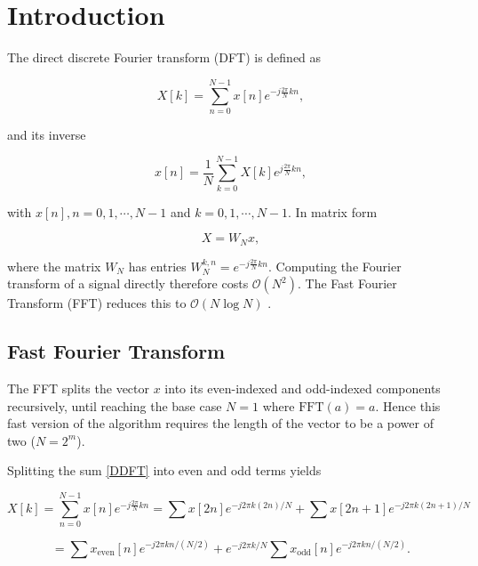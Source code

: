 \documentclass[11pt,a4paper,twoside,pdf]{article}
\numberwithin{equation}{section}
\begin{document}

\tableofcontents


\pagestyle{fancy}
\fancyhead[RO,LE]{\leftmark}
\fancyhead[LO,RE]{\thepage}
\fancyfoot{}



\newpage


\section{Introduction}
\label{intro}


The direct discrete Fourier transform (DFT) is defined as \cite{angulo2012variable}

\begin{equation}
    X[k] = \sum_{n=0}^{N-1} x[n] e^{-j\frac{2\pi}{N}kn},
\tag{1}
\label{DDFT}
\end{equation}

and its inverse

$$
    x[n] = \frac1N\sum_{k=0}^{N-1} X[k] e^{j\frac{2\pi}{N}kn},
$$


with $x[n], n = 0, 1, \cdots, N-1$ and $k = 0, 1, \cdots, N-1$. In matrix form

$$
    X = W_N x,
$$

where the matrix $W_N$ has entries $W^{k,n}_N = e^{-j\frac{2\pi}{N}kn}$. Computing the Fourier transform of a signal directly therefore costs $\mathcal{O}(N^2)$. The Fast Fourier Transform (FFT) reduces this to $\mathcal{O}(N\log N)$ \cite{brigham1988fast}.

\subsection{Fast Fourier Transform}


The FFT splits the vector $x$ into its even-indexed and odd-indexed components recursively, until reaching the base case $N=1$ where $\mathrm{FFT}(a) = a$. Hence this fast version of the algorithm requires the length of the vector to be a power of two ($N = 2^m$).

Splitting the sum \ref{DDFT} into even and odd terms yields

$$
    X[k] = \sum_{n=0}^{N-1} x[n] e^{-j\frac{2\pi}{N}kn}
    = \sum x[2n] e^{-j2\pi k (2n) / N} +
    \sum x[2n+1] e^{-j2\pi k (2n+1) / N}
$$

$$
    = \sum x_{\text{even}}[n] e^{-j2\pi kn / (N/2)} +
    e^{-j2\pi k/N} \sum x_{\text{odd}}[n] e^{-j2\pi k n / (N/2)}.
$$
\end{document}
